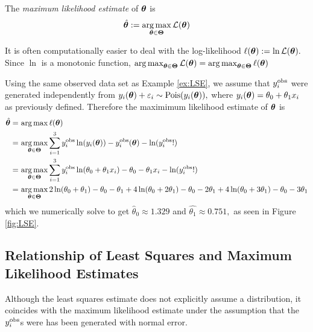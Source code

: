 \begin{definition}
    The \emph{maximum likelihood estimate} of $\bm{\theta}$ is
    $$
        \hat{\bm{\theta}}
        := \operatorname*{arg\,max}_{\bm{\theta}\in\mathbf{\Theta}} \mathcal{L}(\bm{\theta})
    $$
\end{definition}

It is often computationally easier to deal with the log-likelihood
$\ell(\bm{\theta}) := \ln\mathcal{L}(\bm{\theta}).$ Since $\ln$ is a monotonic function,
$\operatorname*{arg\,max}_{\bm{\theta}\in\mathbf{\Theta}} \mathcal{L}(\bm{\theta})
    = \operatorname*{arg\,max}_{\bm{\theta}\in\mathbf{\Theta}} \ell(\bm{\theta})$

\begin{example}
    Using the same observed data set as Example \ref{ex:LSE}, we assume that
    $y_i^{\mathrm{obs}}$ were generated independently from
    $y_i(\bm{\theta}) + \varepsilon_i \sim \operatorname{Pois}(y_i(\bm{\theta})),$ where
    $y_i(\bm{\theta}) = \theta_0 + \theta_1x_i$ as previously defined. Therefore
    the maximimum likelihood estimate of $\bm{\theta}$ is
    \begin{align*}
        \hat{\bm{\theta}}
        = & \, \operatorname*{arg\,max} \ell(\bm{\theta})                                  \\
        = & \, \operatorname*{arg\,max}_{\bm{\theta}\in\mathbf{\Theta}}\sum_{i = 1}^{3}
        y_i^{\mathrm{obs}}\ln(y_i(\bm{\theta})) -y_i^{\mathrm{obs}}(\bm{\theta}) - \ln(y_i^{\mathrm{obs}}!) \\
        = & \, \operatorname*{arg\,max}_{\bm{\theta}\in\mathbf{\Theta}}\sum_{i = 1}^{3}
        y_i^{\mathrm{obs}}\ln(\theta_0 + \theta_1x_i)
        - \theta_0 - \theta_1x_i
        - \ln(y_i^{\mathrm{obs}}!)                                              \\
        = & \, \operatorname*{arg\,max}_{\bm{\theta}\in\mathbf{\Theta}}
        2\ln(\theta_0 + \theta_1) - \theta_0 - \theta_1
        + 4\ln(\theta_0 + 2\theta_1) - \theta_0 - 2\theta_1
        + 4\ln(\theta_0 + 3\theta_1) - \theta_0 - 3\theta_1
    \end{align*}
    which we numerically solve to get $\hat{\theta}_0 \approx 1.329$
    and $\hat{\theta_1} \approx 0.751,$ as seen in Figure \ref{fig:LSE}.
\end{example}

\subsection*{Relationship of Least Squares and Maximum Likelihood Estimates}

Although the least squares estimate does not explicitly assume a distribution,
it coincides with the maximum likelihood estimate under the assumption that
the $y_i^{\mathrm{obs}}$s were has been generated with normal error.

